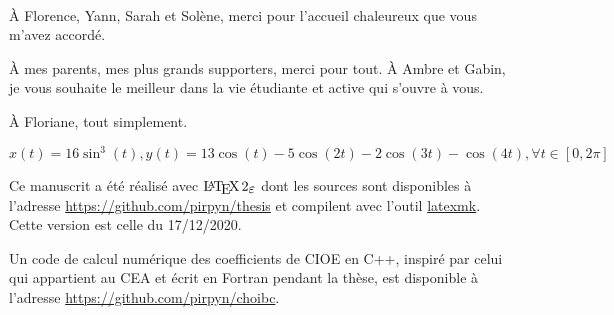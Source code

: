 ~{}\\

À Florence, Yann, Sarah et Solène, merci pour l'accueil chaleureux que vous m'avez accordé.

À mes parents, mes plus grands supporters, merci pour tout. À Ambre et Gabin, je vous souhaite le meilleur dans la vie étudiante et active qui s'ouvre à vous.

À Floriane, tout simplement.

\href{https://www.wolframalpha.com/input/?i=parametric+plot+x+\%3D+16+sin\%5E3+t\%2C+y+\%3D+13+cos+t+-+5+cos\%282+t\%29+-+2+cos+\%28+3+t+\%29+-cos\%284t\%29}{\(x(t) = 16 \sin^3(t), y(t) = 13 \cos(t) - 5 \cos(2 t) - 2 \cos ( 3 t ) - \cos(4t), \forall t \in [0,2\pi]\)}


Ce manuscrit a été réalisé avec \(\LaTeXe\) dont les sources sont disponibles à l'adresse \url{https://github.com/pirpyn/thesis} et compilent avec l'outil \href{https://mg.readthedocs.io/latexmk.html}{latexmk}. 
Cette version est celle du 17/12/2020.

Un code de calcul numérique des coefficients de CIOE en C++, inspiré par celui qui appartient au CEA et écrit en Fortran pendant la thèse, est disponible à l'adresse \url{https://github.com/pirpyn/choibc}.


